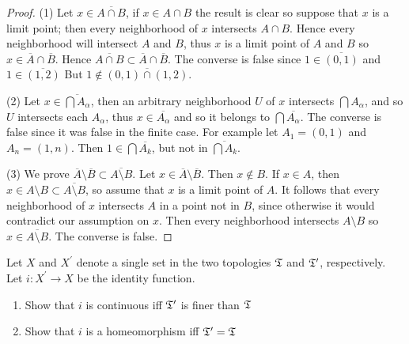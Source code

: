     \begin{proof}
        (1) Let $x \in \overline{A \cap B}$, if $x \in A \cap B$ the result is clear so suppose that $x$ is a limit point; then every neighborhood of $x$ intersects $A \cap B$. 
        Hence every neighborhood will intersect $A$ and $B$, thus $x$ is a limit point of $A$ and $B$ so $x \in \overline{A} \cap \overline{B}$. Hence $\overline{A \cap B} \subset \overline{A} \cap \overline{B}$. 
        The converse is false since $1 \in \overline{(0,1)}$ and $1 \in \overline{(1, 2)}$ But $1 \notin \overline{(0,1) \cap (1, 2)}$. 
        
        (2) Let $x \in \overline{\bigcap A_\alpha}$, then an arbitrary neighborhood $U$
        of $x$ intersects $\bigcap A_\alpha$, and so $U$ intersects each $A_\alpha$, thus $x \in \overline{A_\alpha}$ and so it belongs to $\bigcap \overline{A_\alpha}$. 
        The converse is false since it was false in the finite case. For example let $A_1 = (0,1)$ and $A_n = (1, n)$. Then $1 \in \bigcap \overline{A_k}$, but not 
        in $\overline{\bigcap A_k}$.


        (3) We prove $\overline{A} \setminus \overline{B} \subset \overline{A \setminus B}$. Let $x \in \overline{A} \setminus \overline{B}$. Then $x \notin B$. If $x \in A$, then 
        $x \in A \setminus B \subset \overline{A \setminus B}$, so assume that $x$ is a limit point of $A$. It follows that every neighborhood of $x$ intersects $A$ in a point not in $B$, since otherwise
        it would contradict our assumption on $x$. Then every neighborhood intersects $A \setminus B$ so $x \in \overline{A \setminus B}$. The converse is false. 
    \end{proof}



    \question 
    Let $X$ and $X^\prime$ denote a single set in the two topologies $\mathfrak{T}$ and $\mathfrak{T}^\prime$, respectively. 
    Let $i: X^\prime \to X$ be the identity function. 
    \begin{enumerate}
        \item Show that $i$ is continuous iff $\mathfrak{T}^\prime$ is finer than $\mathfrak{T}$
        \item Show that $i$ is a homeomorphism iff $\mathfrak{T}^\prime = \mathfrak{T}$
    \end{enumerate}


